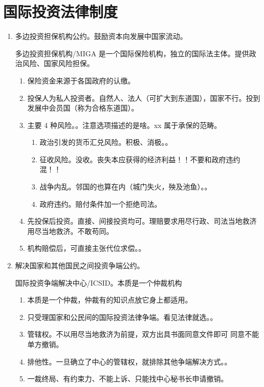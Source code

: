 \section{国际投资法律制度}
\begin{enumerate}
  \item 多边投资担保机构公约。鼓励资本向发展中国家流动。
        \begin{kk}{多边投资担保机构/MIGA}
          是一个国际保险机构，独立的国际法主体。提供政治风险、国家风险担保。
          \begin{enumerate}
            \item 保险资金来源于各国政府的认缴。
            \item 投保人为私人投资者。自然人、法人（可扩大到东道国），国家不行。投到发展中会员国（称为合格东道国）。
            \item 主要 4 种风险。。注意选项描述的是啥。xx 属于承保的范畴。
                  \begin{enumerate}
                    \item 政治引发的货币汇兑风险。积极、消极。。
                    \item 征收风险。\yi 没收。\er 丧失本应获得的经济利益！！不要和政府违约混！！
                    \item 战争内乱。邻国的也算在内（城门失火，殃及池鱼）。。
                    \item 政府违约。赔付条件加一个拒绝司法。
                  \end{enumerate}
            \item 先投保后投资。\yi 直接、间接投资均可。\er 理赔要求用尽行政、司法当地救济 \bdy 用尽当地救济。不敢苟同。
            \item 机构赔偿后，可直接主张代位求偿。。
          \end{enumerate}
        \end{kk}

  \item 解决国家和其他国民之间投资争端公约。
        \begin{kk}{国际投资争端解决中心/ICSID。本质是一个仲裁机构}
          \begin{enumerate}
            \item 本质是一个仲裁，仲裁有的知识点放它身上都适用。
            \item 只受理国家和公民间的国际投资法律争端。看见法律就选。。
            \item 管辖权。不以用尽当地救济为前提，双方出具书面同意文件即可 \yjt 同意不能单方撤销。
            \item 排他性。一旦确立了中心的管辖权，就排除其他争端解决方式。。
            \item 一裁终局、有约束力、不能上诉、只能找中心秘书长申请撤销。
          \end{enumerate}
        \end{kk}
\end{enumerate}
